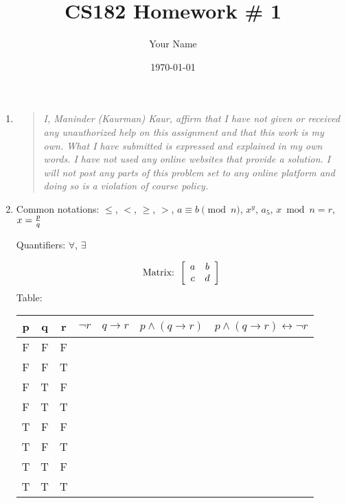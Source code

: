 \documentclass[11pt]{article}
\title{CS182 Homework \# 1}
\author{Your Name}
\date{\today}
\begin{document}
\maketitle


\begin{enumerate}
    \item %
    \begin{quote}
    \textit{I, Maninder (Kaurman) Kaur, affirm that I have not given or received any unauthorized help on this assignment and that this work is my own. What I have submitted is expressed and explained in my own words. I have not used any online websites that provide a solution. I will not post any parts of this problem set to any online platform and doing so is a violation of course policy.}
    \end{quote}

    \clearpage
    \item Common notations: $\leq$, $<$, $\geq$, $>$, $a\equiv b \pmod{n}$, $x^y$, $a_5$, $x\bmod{n} = r$, $x={p \over q}$

    Quantifiers: $\forall$, $\exists$
    
$$\text{Matrix: }\left[\begin{array}{cc}a & b \cr c & d\end{array}\right]$$
Table:
\begin{center}
 \begin{tabular}{| c | c | c | c |c |c |c|} 
 \hline
 p & q & r & $\neg r$ & $q \rightarrow  r$ & $p \wedge (q \rightarrow r)$ & $p\wedge (q\rightarrow r)\leftrightarrow \neg r$\\ [0.5ex] 
 \hline\hline
  F & F& F &  &  &  & \\ 
 \hline
  F & F& T &  &  &  &\\ 
 \hline
  F & T& F &  & &  &  \\ 
 \hline
  F & T& T &  &  & & \\ 
 \hline
  T & F& F&  &  &  & \\ 
 \hline
  T & F& T &  &  &  & \\ 
 \hline
  T & T & F &  &  &  & \\ 
 \hline
  T & T& T &  &  &  & \\ 
 \hline
\end{tabular}
\end{center}


\end{enumerate}
\end{document}
